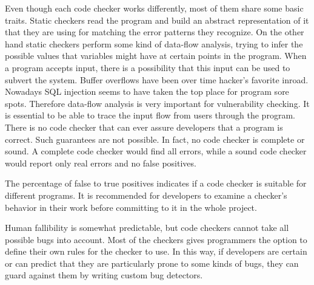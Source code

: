 Even though each code checker works differently, most of them share some basic traits. Static checkers read the program and build an abstract representation of it that they are using for matching the error patterns they recognize. On the other hand static checkers
perform some kind of data-flow analysis, trying to infer the possible values that variables might have at certain points in the program. When a program accepts input, there is a possibility that this input can be used to subvert the system. Buffer overflows have been over time hacker's favorite inroad. Nowadays SQL injection seems to have taken the top
place for program sore spots. Therefore data-flow analysis is very important for vulnerability checking. It is essential to be able to trace the input flow from users through the program. There is no code checker that can ever assure developers that a program is correct. Such guarantees are not possible. In fact, no code checker is complete or sound. A complete code checker would find all errors, while a sound code checker would report only real errors and no false positives.

The percentage of false to true positives indicates if a code checker is suitable for different programs. It is recommended for developers to examine a checker's behavior in their work before committing to it in the whole project. 

Human fallibility is somewhat predictable, but code checkers cannot take all possible bugs into account. Most of the checkers gives programmers the option to define their own rules for the checker to use. In this way, if developers are certain or can predict that they
are particularly prone to some kinds of bugs, they can guard against them by writing custom bug detectors. 

